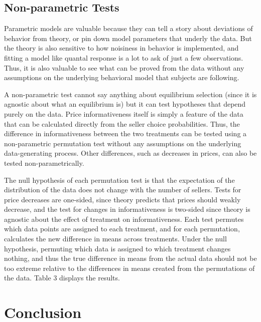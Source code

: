 \documentclass[12pt]{article}
\begin{document}
 


\subsection{Non-parametric Tests}

Parametric models are valuable because they can tell a story about deviations of behavior from theory, or pin down model parameters that underly the data. But the theory is also sensitive to how noisiness in behavior is implemented, and fitting a model like quantal response is a lot to ask of just a few observations. Thus, it is also valuable to see what can be proved from the data without any assumptions on the underlying behavioral model that subjects are following. 

A non-parametric test cannot say anything about equilibrium selection (since it is agnostic about what an equilibrium is) but it can test hypotheses that depend purely on the data. Price informativeness itself is simply a feature of the data that can be calculated directly from the seller choice probabilities. Thus, the difference in informativeness between the two treatments can be tested using a non-parametric permutation test without any assumptions on the underlying data-generating process. Other differences, such as decreases in prices, can also be tested non-parametrically. 

The null hypothesis of each permutation test is that the expectation of the distribution of the data does not change with the number of sellers. Tests for price decreases are one-sided, since theory predicts that prices should weakly decrease, and the test for changes in informativeness is two-sided since theory is agnostic about the effect of treatment on informativeness. Each test permutes which data points are assigned to each treatment, and for each permutation, calculates the new difference in means across treatments. Under the null hypothesis, permuting which data is assigned to which treatment changes nothing, and thus the true difference in means from the actual data should not be too extreme relative to the differences in means created from the permutations of the data. Table 3 displays the results.






\section{Conclusion}
\end{document}
